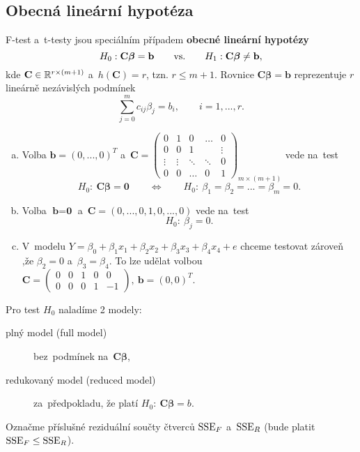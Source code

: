 \subsection{Obecná lineární hypotéza}
F-test a~t-testy jsou speciálním případem \textbf{obecné lineární hypotézy}
$$ H_0: \textbf{C}\boldsymbol{\beta}=\textbf{b} \qquad\text{vs.}\qquad H_1: \textbf{C}\boldsymbol{\beta}\neq\textbf{b},$$
kde $\textbf{C}\in\mathbb{R}^{r\times(m+1)}$ a~$h(\textbf{C})=r$, tzn. $r\leq m+1$. Rovnice $\textbf{C}\boldsymbol{\beta}=\textbf{b}$ reprezentuje $r$ lineárně nezávislých podmínek 
$$ \sum_{j=0}^m c_{ij}\beta_j=b_i,\qquad i=1,...,r.$$
\begin{remark}
	\begin{enumerate}[a)]
		\item Volba $\textbf{b}=(0,...,0)^T$ a~$\textbf{C}=\left(\begin{array}{c|cccc}
		0 & 1 & 0 & \dots & 0 \\\hline
		0 & 0 & 1 &  & \vdots \\
		\vdots& \vdots & \ddots & \ddots & 0 \\
		0 & 0 & \dots & 0 & 1
		\end{array}
		\right)_{m\times(m+1)}$ vede na~test 
		$$ H_0:~\textbf{C}\boldsymbol{\beta}=\textbf{0}\qquad\Leftrightarrow\qquad H_0:~\beta_1=\beta_2=...=\beta_m=0.$$
		\item Volba $\textbf{b}=\textbf{0}$ a~$\textbf{C}=(0,...,0,1,0,...,0)$ vede na~test 
		$$ H_0:~\beta_j=0.$$
		\item V~modelu $Y=\beta_0+\beta_1x_1+\beta_2x_2+\beta_3x_3+\beta_4x_4+e$ chceme testovat zároveň ,že $\beta_2=0$ a~$\beta_3=\beta_4$. To lze udělat volbou $\textbf{C}=\left(\begin{array}{ccccc}
		0 & 0 & 1 & 0 & 0 \\
		0 & 0 & 0 & 1 & -1
		\end{array}
		 \right),~\textbf{b}=(0,0)^T$.
	\end{enumerate}
\end{remark} 

Pro test $H_0$ naladíme 2 modely:\begin{description}
\item[plný model (full model)] bez~podmínek na~$\textbf{C}\boldsymbol{\beta}$,
\item[redukovaný model (reduced model)] za~předpokladu, že platí $H_0:~\textbf{C}\boldsymbol{\beta}=b$. 
\end{description}

Označme příslušné reziduální součty čtverců $\mathrm{SSE}_F$ a~$\mathrm{SSE}_R$ (bude platit $\mathrm{SSE}_F\leq\mathrm{SSE}_R$).

